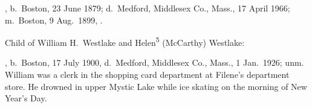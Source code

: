 \begin{Kids}
	, b.\ Boston, 23 June 1879;\cite{Helen5McCarthyBirth} d.\ Medford, Middlesex Co., Mass., 17 April 1966;\cite{Helen5McCarthyDeath} m.\ Boston, 9 Aug.\ 1899, .\cite{Helen5McCarthyMarriage}

\begin{GrandkidsIntro}
	Child of William H.\ Westlake and Helen\textsuperscript{5} (McCarthy) Westlake:
\end{GrandkidsIntro}

\begin{Grandkids}		
	, b.\ Boston, 17 July 1900,\cite{William5WestlakeBirth} d.\ Medford, Middlesex Co., Mass., 1 Jan.\ 1926; unm.\cite{William5WestlakeDeath} William was a clerk in the shopping card department at Filene's department store. He drowned in upper Mystic Lake while ice skating on the morning of New Year's Day.\cite{William5WestlakeDeath}
\end{Grandkids}

\end{Kids}


